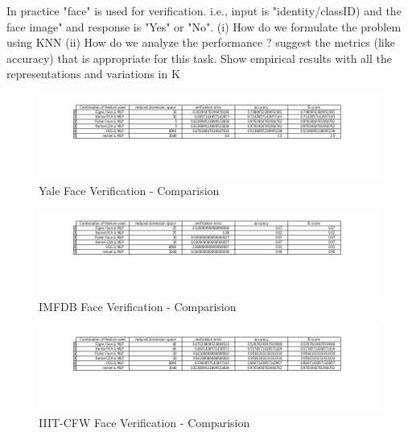 \documentclass[12pt]{article}
\newenvironment{problem}[2][Problem]{\begin{trivlist}
\item[\hskip \labelsep {\bfseries #1}\hskip \labelsep {\bfseries #2.}]}{\end{trivlist}}
\begin{document}
\begin{problem}{4}
In practice "face" is used for verification. i.e., input is "identity/classID) and the face image" and
response is "Yes" or "No". (i) How do we formulate
the problem using KNN (ii) How do we analyze the
performance ? suggest the metrics (like accuracy)
that is appropriate for this task. Show empirical results with all the representations and variations in
K

	\begin{figure}[H]
		\centering
		\includegraphics[width=16cm]{Yale_Face_Verification_Comparision.png}
		\caption{Yale Face Verification - Comparision}
		\label{fig:verticalcell}
	\end{figure}
	
	
	\begin{figure}[H]
		\centering
		\includegraphics[width=16cm]{IMFDB_Face_Verification_Comparision.png}
		\caption{IMFDB Face Verification -  Comparision}
	\end{figure}
	
	
	\begin{figure}[H]
		\centering		\includegraphics[width=16cm]{IIIT_CFW_Face_Verification_Comparision.png}
		\caption{IIIT-CFW Face Verification -  Comparision}
	\end{figure}
	
\end{problem}
\end{document}
